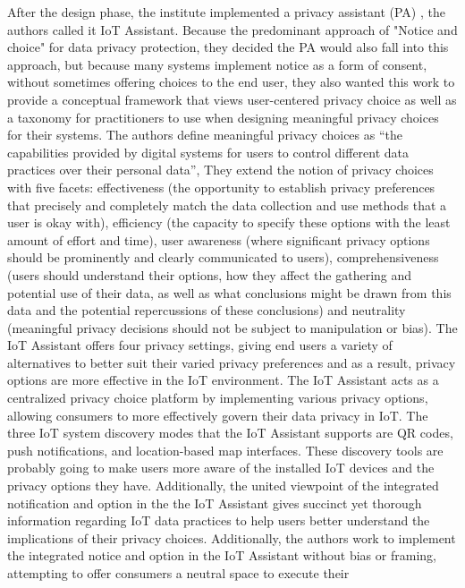 \documentclass[conference]{IEEEtran}
\begin{document}
After the design phase, the institute implemented a privacy assistant (PA) \cite{FengDesign},
the authors called it IoT Assistant. Because the predominant approach of
"Notice and choice" for data privacy protection, they decided the PA would
also fall into this approach, but because many systems implement notice as
a form of consent, without sometimes offering choices to the end user, they
also wanted this work to provide a conceptual framework that views user-centered
privacy choice as well as a taxonomy for practitioners to use when designing
meaningful privacy choices for their systems. The authors define meaningful
privacy choices as ``the capabilities provided by digital systems for users
to control different data practices over their personal data'', They extend
the notion of privacy choices with five facets: effectiveness (the opportunity
to establish privacy preferences that precisely and completely match the data
collection and use methods that a user is okay with), efficiency (the capacity
to specify these options with the least amount of effort and time), user awareness
(where significant privacy options should be prominently and clearly communicated
to users), comprehensiveness (users should understand their options, how they
affect the gathering and potential use of their data, as well as what conclusions
might be drawn from this data and the potential repercussions of these conclusions)
and neutrality (meaningful privacy decisions should not be subject to manipulation
or bias). The IoT Assistant offers four privacy settings, giving end users a
variety of alternatives to better suit their varied privacy preferences and
as a result, privacy options are more effective in the IoT environment. The
IoT Assistant acts as a centralized privacy choice platform by implementing
various privacy options, allowing consumers to more effectively govern their
data privacy in IoT. The three IoT system discovery modes that the IoT Assistant
supports are QR codes, push notifications, and location-based map interfaces.
These discovery tools are probably going to make users more aware of the installed
IoT devices and the privacy options they have. Additionally, the united viewpoint
of the integrated notification and option in the the IoT Assistant gives succinct
yet thorough information regarding IoT data practices to help users better
understand the implications of their privacy choices. Additionally, the authors
work to implement the integrated notice and option in the IoT Assistant without
bias or framing, attempting to offer consumers a neutral space to execute their
\end{document}
